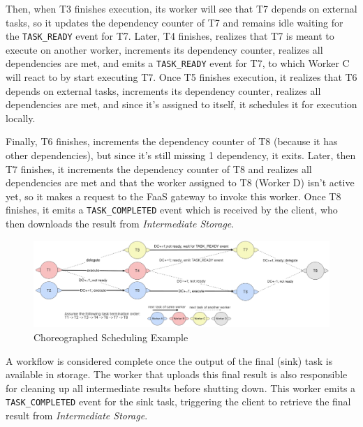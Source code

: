 \documentclass[conference]{IEEEtran}
\begin{document}
Then, when T3 finishes execution, its worker will see that T7 depends on external tasks, so it updates the dependency counter of T7 and remains idle waiting for the \texttt{TASK\_READY} event for T7. Later, T4 finishes, realizes that T7 is meant to execute on another worker, increments its dependency counter, realizes all dependencies are met, and emits a \texttt{TASK\_READY} event for T7, to which Worker C will react to by start executing T7. Once T5 finishes execution, it realizes that T6 depends on external tasks, increments its dependency counter, realizes all dependencies are met, and since it's assigned to itself, it schedules it for execution locally.

Finally, T6 finishes, increments the dependency counter of T8 (because it has other dependencies), but since it's still missing 1 dependency, it exits. Later, then T7 finishes, it increments the dependency counter of T8 and realizes all dependencies are met and that the worker assigned to T8 (Worker D) isn't active yet, so it makes a request to the FaaS gateway to invoke this worker. Once T8 finishes, it emits a \texttt{TASK\_COMPLETED} event which is received by the client, who then downloads the result from \textit{Intermediate Storage}.

\begin{figure}[h]
    \centering
    \includegraphics[width=\textwidth]{figures/choreographed_execution_example.png}
    \caption{Choreographed Scheduling Example}
    \label{fig:choreographed_scheduling_example}
\end{figure}

A workflow is considered complete once the output of the final (sink) task is available in storage. The worker that uploads this final result is also responsible for cleaning up all intermediate results before shutting down. This worker emits a \texttt{TASK\_COMPLETED} event for the sink task, triggering the client to retrieve the final result from \textit{Intermediate Storage}.
\end{document}
